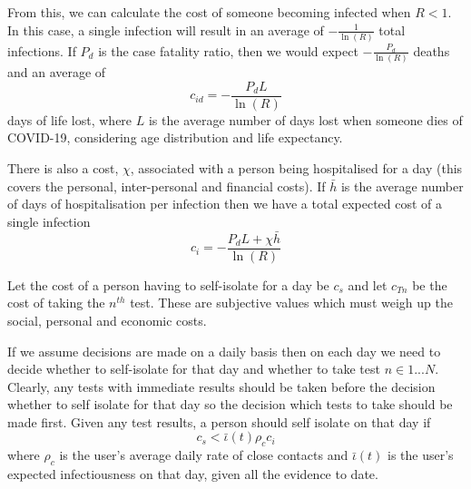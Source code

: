 \documentclass{article}
\begin{document}
From this, we can calculate the cost of someone becoming infected when $R<1$. In this case, a single infection will result in an average of $-\frac{1}{\ln(R)}$ total infections. If $P_d$ is the case fatality ratio, then we would expect $-\frac{P_d}{\ln(R)}$ deaths and an average of
\[
c_{id} = -\frac{P_dL}{\ln(R)}
\]
days of life lost, where $L$ is the average number of days lost when someone dies of COVID-19, considering age distribution and life expectancy.

There is also a cost, $\chi$, associated with a person being hospitalised for a day (this covers the personal, inter-personal and financial costs). If $\bar{h}$ is the average number of days of hospitalisation per infection then we have a total expected cost of a single infection
\[
c_{i} = -\frac{P_dL + \chi\bar{h}}{\ln(R)}
\]

Let the cost of a person having to self-isolate for a day be $c_s$ and let $c_{Tn}$ be the cost of taking the $n^{th}$ test. These are subjective values which must weigh up the social, personal and economic costs.

If we assume decisions are made on a daily basis then on each day we need to decide whether to self-isolate for that day and whether to take test $n \in 1...N$. Clearly, any tests with immediate results should be taken before the decision whether to self isolate for that day so the decision which tests to take should be made first. Given any test results, a person should self isolate on that day if
\[
c_s < \bar{\iota}(t)\rho_cc_i
\]
where $\rho_c$ is the user's average daily rate of close contacts and $\bar{\iota}(t)$ is the user's expected infectiousness on that day, given all the evidence to date.
\end{document}
